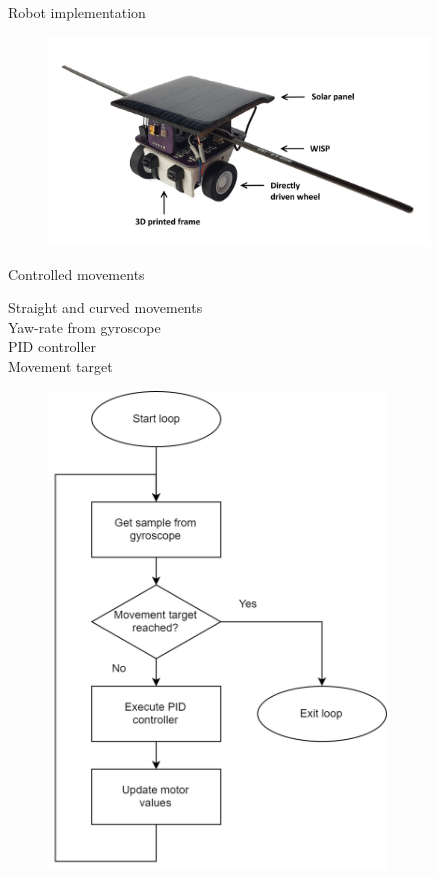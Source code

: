 \documentclass{beamer}
\begin{document}
\begin{frame}{Robot implementation}
	\begin{figure}
		\centering
		\includegraphics[width=0.9\textwidth]{pics/tp_robot2.png}
	\end{figure}
\end{frame}

\begin{frame}{Controlled movements}
	\begin{minipage}{0.45\textwidth}
		Straight and curved movements\\
		
		Yaw-rate from gyroscope \\
		
		PID controller \\
		
		Movement target \\
	\end{minipage}
	\pause
	\begin{minipage}{0.54\textwidth}\raggedleft
		\begin{figure}
			\centering
			\includegraphics[width=0.8\textwidth]{pics/Flowchart_code.png}
		\end{figure}
	\end{minipage}
\end{frame}
\end{document}
